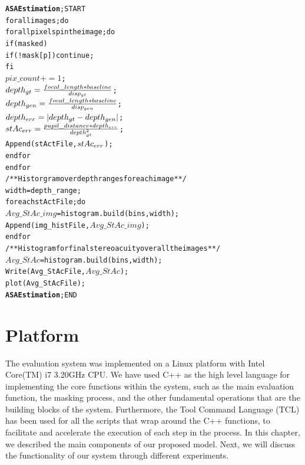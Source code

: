 \begin{alltt}
\textbf{ASA Estimation}; START
   for all images; do
      for all pixels p in the image; do
            if (masked)
               if(!mask[p]) continue;
            fi    
            \(pix\_count += 1\);
            \(depth\sb{gt} = \frac{focal\_length * baseline}{disp\sb{gt}}\);
            \(depth\sb{gen} = \frac{focal\_length * baseline}{disp\sb{gen}}\);
            \(depth\sb{err} = |depth\sb{gt}-depth\sb{gen}|\);
            \(stAc\sb{err} = \frac{pupil\_distance*depth\sb{err}}{depth\sb{gt}\sp{2}}\);
            Append(stActFile,\(stAc\sb{err}\));
      end for
   end for
   /**Historgram over depth ranges for each image**/
   width = depth\_range;
   for each stActFile; do
      \(Avg\_StAc\_img\) = histogram.build(bins,width);
      Append(img\_histFile,\(Avg\_StAc\_img\));
   end for
   /**Histogram for final stereoacuity over all the images**/
   \(Avg\_StAc\) = histogram.build(bins,width);
   Write(Avg\_StAcFile,\(Avg\_StAc\));
   plot(Avg\_StAcFile);
\textbf{ASA Estimation}; END
\end{alltt}

\section{Platform}
The evaluation system was implemented on a Linux platform with Intel Core(TM) i7 3.20GHz CPU. 
We have used C++ as the high level language for implementing 
the core functions within the system, such as the main evaluation function, 
the masking process, and the other fundamental operations that are the building blocks of the system.
Furthermore, the Tool Command Language (TCL) has been used for all the scripts that wrap around the C++ functions,
to facilitate and accelerate the execution of each step in the process. \newline \newline
In this chapter, we described the main components of our proposed model. Next, we will discuss the functionality of our system through different experiments.
